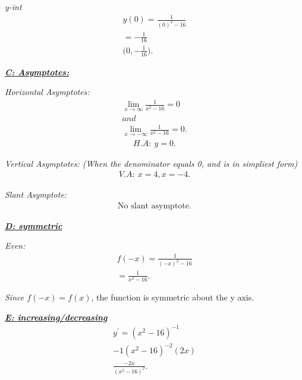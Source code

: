 \documentclass{report}
\begin{document}
  \bigbreak \noindent 
  \textit{y-int}
  \begin{align*}
    y(0) = \frac{1}{(0)^{2}-16} \\
    = -\frac{1}{16} \\
    \boxed{\bigg(0, -\frac{1}{16}\bigg)}
  .\end{align*}

  \bigbreak \noindent 
  \textbf{\textit{\underline{C: Asymptotes:}}}

  \bigbreak \noindent 
  \textit{Horizontal Asymptotes:}
  \begin{align*}
    \lim_{x \to \infty}{\frac{1}{x^{2}-16}} = 0 \\
    and\\
    \lim_{x \to -\infty}{\frac{1}{x^{2}-16}} = 0
  .\end{align*}
  \begin{align*}
    H.A:\ y=0
  .\end{align*}

  \bigbreak \noindent 

  \bigbreak \noindent 
  \textit{Vertical Asymptotes: (When the denominator equals 0, and is in simpliest form)}
  \begin{align*}
    \boxed{V.A:\ x=4,x=-4}  
  .\end{align*}

  \bigbreak \noindent 
  \textit{Slant Asymptote:}
  \begin{align*}
    \boxed{\text{No slant asymptote}}
  .\end{align*}
  \bigbreak \noindent 

  \bigbreak \noindent 
  \textbf{\textit{\underline{D: symmetric}}}

  \bigbreak \noindent 
  \textit{Even:}
  \begin{align*}
    f(-x) = \frac{1}{(-x)^{2}-16} \\
    =\frac{1}{x^{2}-16}
  .\end{align*}

  \bigbreak \noindent 
  \textit{Since $f(-x)=f(x)$}, the function is symmetric about the y axis.

  \bigbreak \noindent 
  \textbf{\textit{\underline{E: increasing/decreasing}}}
  \begin{align*}
    y^{\prime} = (x^{2}-16)^{-1} \\
    -1(x^{2}-16)^{-2}(2x) \\
    \frac{-2x}{(x^{2}-16)^{2}}
  .\end{align*}
\end{document}

